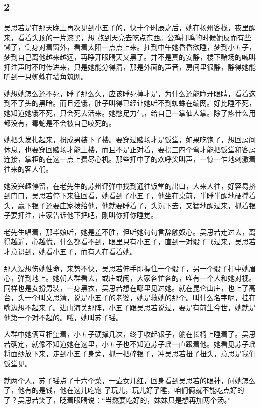 {\centering\subsection{2}}

吴思若是在那天晚上再次见到小五子的，快十个时辰之后，她在扬州客栈，夜里醒来，看着头顶的一片漆黑，想
熬到天亮去吃点东西。公鸡打鸣的时候她反而有些懒了，侧身对着窗外，看着太阳一点点上来。扛到中午她昏昏欲睡，梦到小五子，梦到自己离他越来越远，再睁开眼睛天又黑了。并不是真的安静，楼下赌场的喊叫押注声时不时传进来，只是她能分得清，那是外面的声音，房间里很静，静得她能听到一只蜘蛛在墙角筑网。

她想她怎么还不死，睡了那么久，应该睡死掉才是，为什么还能睁开眼睛，看着这到不了头的黑暗。而且还饿，肚子叫得已经让她听不到蜘蛛在编网。好比睡不死，她知道她饿不死，只会死去活来。她憋足力气，给自己一掌仙人掌。除了疼什么用都没有，毒蛇是不会被自己咬死的。

她把头发扎起来，扮成男装下了楼。要穿过赌场才是饭堂，如果吃饱了，想回房间休息，也要穿回赌场才能上楼，而且不是正对着，要拐三四个弯才能把饭堂和客房连接，掌柜的在这一点上费尽心机。那些押中了的欢呼尖叫声，一惊一乍地刺激着往来的客人们。

她没兴趣停留，在老先生的苏州评弹中找到通往饭堂的出口，人来人往，好容易挤到门口，吴思若停下来往回看，她看到了小五子，他坐在桌前，半睡半醒地硬撑着头，赢下银子还要庄家拨给他，他就要睡着了，头沉下去，又猛地醒过来，抓着银子要押注，庄家告诉他下把吧，刚叫你押你睡觉。

老先生唱着，那毕娘听，她是羞不胜，但听她句句言辞触奴心。吴思若走过去，离得越近，心越慌，什么都看不到，眼里只有小五子，直到一对骰子飞过来，吴思若才意识到，她看小五子，而有人在看着她。

那人没想伤她性命，来势不快，吴思若伸手即握住一个骰子，另一个骰子打中她眉心，弹到地上。她朝人群看去，或庄或闲，大家各忙各的，唯有一个人和她对视。同样也是女扮男装，一身黑衣，吴思若想在哪里见过她。就在昆仑山庄，也上了高台，头一个叫文思清，说是小五子的老婆，她是救她的那个。叫什么名字呢，挂在嘴边想不起来了。进山海关那阵，小五子跟吴思若说过，要是有前生今世，她就是他第一个对不起的。哦，她叫苏子瑶。

人群中她俩互相望着，小五子硬撑几次，终于收起银子，躺在长椅上睡着了。吴思若确定，就像不知道她在这里，小五子也不知道苏子瑶一直跟着他。她看见苏子瑶将面纱放下来，走到小五子身旁，抓一把碎银子，冲吴思若扭了扭头，意思是我们饭堂见。

就两个人，苏子瑶点了十六个菜，一壶女儿红，回身看到吴思若的眼神，问她怎么了，他有的是钱，他在这儿吃饱
了玩儿，玩儿好了睡，咱们俩就不能吃点好的了？吴思若笑了，眨着眼睛说：“当然要吃好的，妹妹只是想再加两个汤。”

